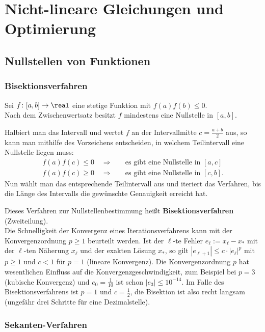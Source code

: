 \section{%
    Nicht-lineare Gleichungen und Optimierung%
}

\subsection{%
    Nullstellen von Funktionen%
}

\subsubsection{%
    Bisektionsverfahren%
}

Sei $f\colon [a, b] \rightarrow \real$ eine stetige Funktion mit
$f(a) f(b) \le 0$. \\
Nach dem Zwischenwertsatz besitzt $f$ mindestens eine Nullstelle
in $[a, b]$.

Halbiert man das Intervall und wertet $f$ an der Intervallmitte
$c = \frac{a + b}{2}$ aus, so kann man mithilfe des Vorzeichens entscheiden,
in welchem Teilintervall eine Nullstelle liegen muss:
\begin{align*}
    f(a)f(c) \le 0 \quad\Rightarrow &
    \quad\text{es gibt eine Nullstelle in } [a, c] \\
    f(a)f(c) \ge 0 \quad\Rightarrow &
    \quad\text{es gibt eine Nullstelle in } [c, b].
\end{align*}
Nun wählt man das entsprechende Teilintervall aus und iteriert das Verfahren,
bis die Länge des Intervalls die gewünschte Genauigkeit erreicht hat.

Dieses Verfahren zur Nullstellenbestimmung heißt \textbf{Bisektionsverfahren}
(Zweiteilung). \\
Die Schnelligkeit der Konvergenz eines Iterationsverfahrens kann mit
der Konvergenzordnung $p \ge 1$ beurteilt werden.
Ist der $\ell$-te Fehler $e_\ell := x_\ell - x_\ast$ mit der $\ell$-ten
Näherung $x_\ell$ und der exakten Lösung $x_\ast$, so gilt
$|e_{\ell+1}| \le c \cdot |e_\ell|^p$ mit $p \ge 1$ und
$c < 1$ für $p = 1$ (lineare Konvergenz).
Die Konvergenzordnung $p$ hat wesentlichen Einfluss auf die
Konvergenzgeschwindigkeit, zum Beispiel bei $p = 3$ (kubische Konvergenz)
und $e_0 = \frac{1}{10}$ ist schon $|e_3| \le 10^{-14}$.
Im Falle des Bisektionsverfahrens ist $p = 1$ und $c = \frac{1}{2}$,
die Bisektion ist also recht langsam
(ungefähr drei Schritte für eine Dezimalstelle).

\subsubsection{%
    Sekanten-Verfahren%
}

